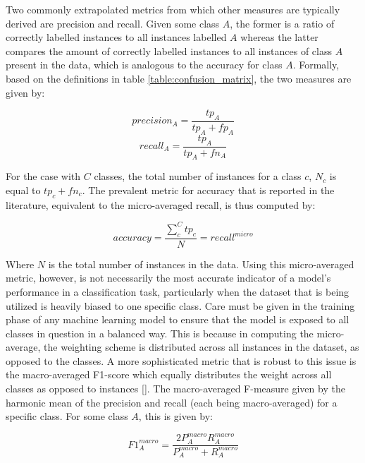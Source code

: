 \documentclass[12pt, a4paper]{report}
\theoremstyle{definition}
\theoremstyle{definition}%
\theoremstyle{definition}%
\theoremstyle{definition}%
\theoremstyle{definition}%
\theoremstyle{definition}%
\renewcommand{\cite}[1]{[\citealp{#1}]}
\begin{document}
Two commonly extrapolated metrics from which other measures are typically derived are precision and recall. Given some class $A$, the former is a ratio of correctly labelled instances to all instances labelled $A$ whereas the latter compares the amount of correctly labelled instances to all instances of class $A$ present in the data, which is analogous to the accuracy for class $A$. Formally, based on the definitions in table \ref{table:confusion_matrix}, the two measures are given by: 

\begin{equation} \label{eq:precision}
    precision_A = \frac{tp_A}{tp_A + fp_A}
\end{equation}
\begin{equation} \label{eq:recall}
    recall_A = \frac{tp_A}{tp_A + fn_A}
\end{equation}

For the case with $C$ classes, the total number of instances for a class $c$, $N_c$ is equal to $tp_c + fn_c$. The prevalent metric for accuracy that is reported in the literature, equivalent to the micro-averaged recall, is thus computed by:

\begin{equation} \label{eq:accuracy}
    accuracy = \frac{\sum_{c}^{C}tp_c}{N} = recall^{micro}
\end{equation}

Where $N$ is the total number of instances in the data. Using this micro-averaged metric, however, is not necessarily the most accurate indicator of a model's performance in a classification task, particularly when the dataset that is being utilized is heavily biased to one specific class. Care must be given in the training phase of any machine learning model to ensure that the model is exposed to all classes in question in a balanced way. This is because in computing the micro-average, the weighting scheme is distributed across all instances in the dataset, as opposed to the classes. A more sophisticated metric that is robust to this issue is the macro-averaged F1-score which equally distributes the weight across all classes as opposed to instances \cite{manning2010}. The macro-averaged F-measure given by the harmonic mean of the precision and recall (each being macro-averaged) for a specific class. For some class $A$, this is given by: 

\begin{equation} \label{eq:f1_measure}
    F1^{macro}_{A} = \frac{2P^{macro}_{A}R^{macro}_{A}}{P^{macro}_{A}+R^{macro}_{A}}
\end{equation}
\end{document}
